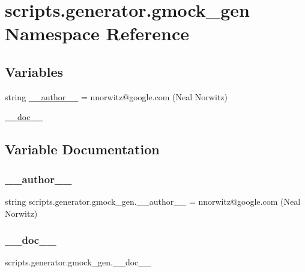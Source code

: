 \hypertarget{namespacescripts_1_1generator_1_1gmock__gen}{}\section{scripts.\+generator.\+gmock\+\_\+gen Namespace Reference}
\label{namespacescripts_1_1generator_1_1gmock__gen}
\subsection*{Variables}
\begin{DoxyCompactItemize}
\item 
string \mbox{\hyperlink{namespacescripts_1_1generator_1_1gmock__gen_afcc789770dfc60c0f50a88f38d914870}{\+\_\+\+\_\+author\+\_\+\+\_\+}} = \textquotesingle{}nnorwitz@google.\+com (Neal Norwitz)\textquotesingle{}
\item 
\mbox{\hyperlink{namespacescripts_1_1generator_1_1gmock__gen_ab5900c92174bc7217b98374618b7d3dc}{\+\_\+\+\_\+doc\+\_\+\+\_\+}}
\end{DoxyCompactItemize}


\subsection{Variable Documentation}
\mbox{\label{namespacescripts_1_1generator_1_1gmock__gen_afcc789770dfc60c0f50a88f38d914870}} 
\subsubsection{\texorpdfstring{\_\_author\_\_}{\_\_author\_\_}}
{\footnotesize\ttfamily string scripts.\+generator.\+gmock\+\_\+gen.\+\_\+\+\_\+author\+\_\+\+\_\+ = \textquotesingle{}nnorwitz@google.\+com (Neal Norwitz)\textquotesingle{}\hspace{0.3cm}{\ttfamily [private]}}

\mbox{\label{namespacescripts_1_1generator_1_1gmock__gen_ab5900c92174bc7217b98374618b7d3dc}} 
\subsubsection{\texorpdfstring{\_\_doc\_\_}{\_\_doc\_\_}}
{\footnotesize\ttfamily scripts.\+generator.\+gmock\+\_\+gen.\+\_\+\+\_\+doc\+\_\+\+\_\+\hspace{0.3cm}{\ttfamily [private]}}

